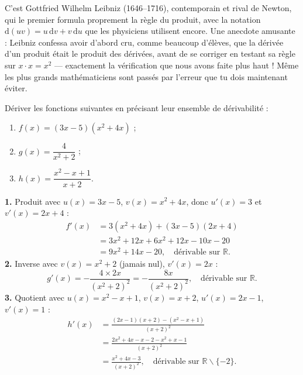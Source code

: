 \documentclass[11pt]{article}
\def\setminus{\mathbin{\backslash}}\let\smallsetminus\setminus
\begin{document}
\begin{savaistu}
C'est Gottfried Wilhelm Leibniz (1646--1716), contemporain et rival de Newton, qui le premier formula proprement la règle du produit, avec la notation $\mathrm{d}(uv) = u\,\mathrm{d}v + v\,\mathrm{d}u$ que les physiciens utilisent encore. Une anecdote amusante : Leibniz confessa avoir d'abord cru, comme beaucoup d'élèves, que la dérivée d'un produit était le produit des dérivées, avant de se corriger en testant sa règle sur $x \cdot x = x^2$ — exactement la vérification que nous avons faite plus haut ! Même les plus grands mathématiciens sont passés par l'erreur que tu dois maintenant éviter.
\end{savaistu}

\begin{exercice}
Dériver les fonctions suivantes en précisant leur ensemble de dérivabilité :
\begin{enumerate}
\item $f(x) = (3x - 5)(x^2 + 4x)$ ;
\item $g(x) = \dfrac{4}{x^2 + 2}$ ;
\item $h(x) = \dfrac{x^2 - x + 1}{x + 2}$.
\end{enumerate}
\end{exercice}

\begin{corrige}[Exercice]
\textbf{1.} Produit avec $u(x) = 3x-5$, $v(x) = x^2+4x$, donc $u'(x) = 3$ et $v'(x) = 2x+4$ :
\begin{align*}
f'(x) &= 3(x^2+4x) + (3x-5)(2x+4) \\
&= 3x^2 + 12x + 6x^2 + 12x - 10x - 20 \\
&= 9x^2 + 14x - 20, \quad \text{dérivable sur } \mathbb{R}.
\end{align*}
\textbf{2.} Inverse avec $v(x) = x^2+2$ (jamais nul), $v'(x) = 2x$ :
\[ g'(x) = -\frac{4 \times 2x}{(x^2+2)^2} = -\frac{8x}{(x^2+2)^2}, \quad \text{dérivable sur } \mathbb{R}. \]
\textbf{3.} Quotient avec $u(x) = x^2 - x + 1$, $v(x) = x+2$, $u'(x) = 2x-1$, $v'(x) = 1$ :
\begin{align*}
h'(x) &= \frac{(2x-1)(x+2) - (x^2 - x + 1)}{(x+2)^2} \\
&= \frac{2x^2 + 4x - x - 2 - x^2 + x - 1}{(x+2)^2} \\
&= \frac{x^2 + 4x - 3}{(x+2)^2}, \quad \text{dérivable sur } \mathbb{R} \setminus \{-2\}.
\end{align*}
\end{corrige}
\end{document}
